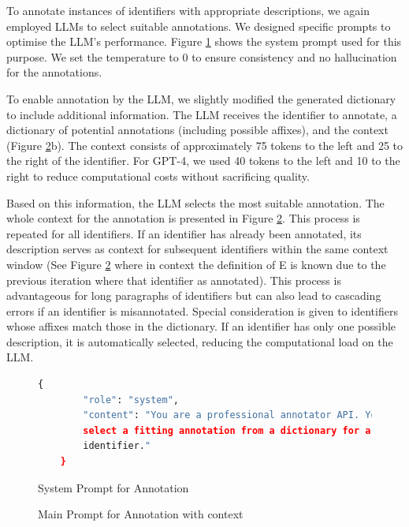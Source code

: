 To annotate instances of identifiers with appropriate descriptions, we again employed \ac{LLMs} to select suitable annotations. We designed specific prompts to optimise the LLM's performance. Figure \ref{fig:prompt_anno_system} shows the system prompt used for this purpose. We set the temperature to 0 to ensure consistency and no hallucination for the annotations.

To enable annotation by the LLM, we slightly modified the generated dictionary to include additional information. The LLM receives the identifier to annotate, a dictionary of potential annotations (including possible affixes), and the context (Figure \ref{fig:prompt_anno_main}b). The context consists of approximately 75 tokens to the left and 25 to the right of the identifier. For GPT-4, we used 40 tokens to the left and 10 to the right to reduce computational costs without sacrificing quality.

Based on this information, the LLM selects the most suitable annotation. The whole context for the annotation is presented in Figure \ref{fig:prompt_anno_main}. This process is repeated for all identifiers. If an identifier has already been annotated, its description serves as context for subsequent identifiers within the same context window (See Figure \ref{fig:prompt_anno_main} where in context the definition of E is known due to the previous iteration where that identifier as annotated). This process is advantageous for long paragraphs of identifiers but can also lead to cascading errors if an identifier is misannotated. Special consideration is given to identifiers whose affixes match those in the dictionary. If an identifier has only one possible description, it is automatically selected, reducing the computational load on the LLM.

\begin{figure}[htpb]
  \centering
  \begin{lstlisting}[language=python]
    {
        "role": "system",
        "content": "You are a professional annotator API. Your job is to 
        select a fitting annotation from a dictionary for a mathematical
        identifier."
    }
  \end{lstlisting}
  \caption[System Prompt for Annotation]{System Prompt for Annotation}\label{fig:prompt_anno_system}
\end{figure}

\begin{figure}[htpb]
  \centering
  \quad 
  \caption[User Prompt for Annotation]{Main Prompt for Annotation with context}\label{fig:prompt_anno_main}
\end{figure}


